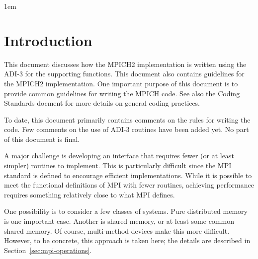 \documentclass{article}
\begin{document}


{}

\clearpage

\tableofcontents
\clearpage


\raggedright
\parindent 1em
\parskip 0pt
\pagestyle{headings}

\section{Introduction}
This document discusses how the MPICH2 implementation is written using
the ADI-3 \cite{adi3man} for the supporting functions.  This document
also contains guidelines for the MPICH2 implementation.  One important
purpose of this document is to provide common guidelines for writing
the MPICH code. 
See also the Coding Standards docment \cite{coding-standards} for more
details on general coding practices.

To date, this document primarily contains comments on the rules for
writing the code.  Few comments on the use of ADI-3 routines have been
added yet.  No part of this document is final.

A major challenge is developing an interface that requires fewer (or
at least simpler) routines to implement.  This is particularly
difficult since the MPI standard is defined to encourage efficient
implementations.  While it is possible to meet the functional
definitions of MPI with fewer routines, achieving performance requires
something relatively close to what MPI defines.

One possibility is to consider a few classes of systems.  Pure
distributed memory is one important case.  Another is shared memory,
or at least some common shared memory.  Of course, multi-method
devices make this more difficult.  However, to be concrete, this
approach is taken here; the details are described in
Section~\ref{sec:mpi-operations}.
\end{document}
